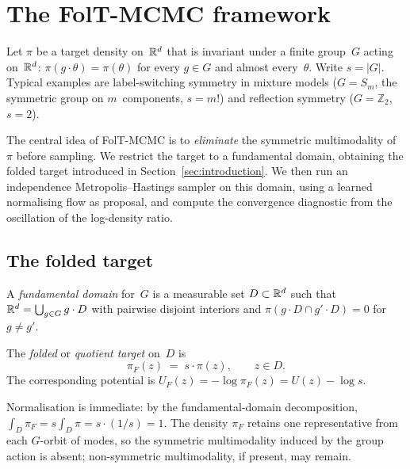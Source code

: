 %  

\section{The FolT-MCMC framework}
\label{sec:framework}

Let $\pi$ be a target density on~$\mathbb{R}^d$ that is invariant under a
finite group~$G$ acting on~$\mathbb{R}^d$: $\pi(g \cdot \theta) = \pi(\theta)$
for every $g \in G$ and almost every~$\theta$.  Write $s = |G|$.
Typical examples are label-switching symmetry in mixture models
($G = S_m$, the symmetric group on $m$~components, $s = m!$) and
reflection symmetry ($G = \mathbb{Z}_2$, $s = 2$).

The central idea of FolT-MCMC is to \emph{eliminate} the symmetric
multimodality of~$\pi$ before sampling.  We restrict the target
to a fundamental domain, obtaining the folded target introduced
in Section~\ref{sec:introduction}.  We then run an independence
Metropolis--Hastings sampler on this domain, using a learned
normalising flow as proposal, and compute the convergence
diagnostic from the oscillation of the log-density ratio.


\subsection{The folded target}
\label{sec:quotient_target}

A \emph{fundamental domain} for~$G$ is a measurable set
$D \subset \mathbb{R}^d$ such that $\mathbb{R}^d = \bigcup_{g \in G} g \cdot D$
with pairwise disjoint interiors and
$\pi(g \cdot D \cap g' \cdot D) = 0$ for $g \neq g'$.

\begin{definition}\label{def:quotient_target}
  The \emph{folded} or \emph{quotient target} on~$D$ is
  \begin{equation}\label{eq:pi_F}
    \pi_F(z) \;=\; s \cdot \pi(z), \qquad z \in D.
  \end{equation}
  The corresponding potential is
  $U_F(z) = -\log\pi_F(z) = U(z) - \log s$.
\end{definition}

\noindent
Normalisation is immediate: by the fundamental-domain decomposition,
$\int_D \pi_F = s \int_D \pi = s \cdot (1/s) = 1$.
The density $\pi_F$ retains one representative from each $G$-orbit
of modes, so the symmetric multimodality induced by the group action
is absent; non-symmetric multimodality, if present, may remain.

